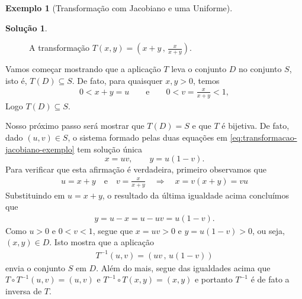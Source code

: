 \documentclass[12pt,portuguese]{article}
\theoremstyle{definition}
\newtheorem{example}[example]{Exemplo}
\theoremstyle{plainexercise}
\theoremstyle{starredexercise}
\theoremstyle{definition}
\newtheorem*{solution}{Solução}
\begin{document}
\begin{example}[Transformação com Jacobiano e uma Uniforme]
\begin{solution}
\begin{figure}[H]
\caption{A transformação $T(x,y)=\left( x+y\, , \, \displaystyle\frac{x}{x+y} \right)$.}
\label{fig:dominio-faixa-transformacao}
\end{figure}
  \smallskip

Vamos começar mostrando que a aplicação $T$ leva o conjunto $D$ no conjunto $S$, isto é,
$T(D)\subseteq S$. De fato, para quaisquer $x, y > 0$, temos
\begin{align*}
0< x+y = u
\qquad \text{e}\qquad 
0< v = \frac{x}{x+y}<1,
\end{align*}
Logo $T(D) \subseteq S$.

\smallskip
Nosso próximo passo será mostrar que $T(D)=S$ e que $T$ é bijetiva. 
De fato, dado $(u,v) \in S$, o sistema formado pelas duas equações em
\eqref{eq:transformacao-jacobiano-exemplo} tem solução única
\begin{equation}\label{eq:inversa-jacobiano-exemplo}
x = uv, \qquad y = u(1-v).
\end{equation}
Para verificar que esta afirmação é verdadeira, primeiro observamos que 
\begin{align*}
u=x+y \quad \text{e} \quad v = \frac{x}{x+y} \quad \Longrightarrow \quad x = v(x+y) = vu 
\end{align*}
Substituindo em $u=x+y$, o resultado da última igualdade acima concluímos que
\begin{align*}
y = u - x = u - uv = u(1-v). 
\end{align*}
Como $u > 0$ e $0 < v < 1$, segue que
$x = uv > 0$ e $y = u(1-v) > 0$, ou seja, $(x,y) \in D$. 
Isto mostra que a aplicação 
\begin{align*}
T^{-1}(u,v) = (uv\, ,\, u(1-v))
\end{align*}
envia o conjunto $S$ em $D$. Além do mais, segue das igualdades acima que
$T\circ T^{-1}(u,v)=(u,v)$ e $T^{-1}\circ T(x,y)=(x,y)$ e portanto $T^{-1}$
é de fato a inversa de $T$.  


\end{solution}
\end{example}
\end{document}
